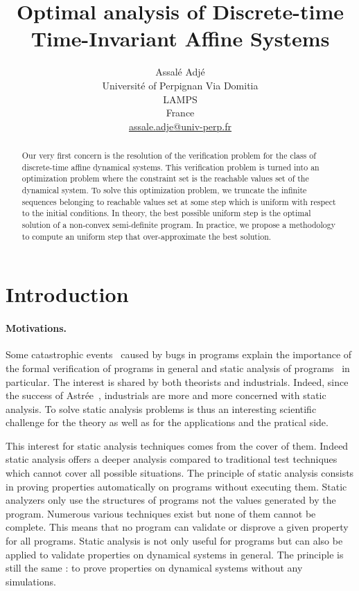 \documentclass[10pt]{article}
\title{Optimal analysis of Discrete-time Time-Invariant Affine Systems}
\author{Assalé Adjé\\
Université of Perpignan Via Domitia\\
LAMPS\\
France\\
\url{assale.adje@univ-perp.fr}
}
\date{}%
\begin{document}
\maketitle
\begin{abstract}
 Our very first concern is the resolution of the verification problem for the class of discrete-time affine dynamical systems. This verification problem is turned into an optimization problem where the constraint set is the reachable values set of the dynamical system. To solve this optimization problem, we truncate the infinite sequences belonging to reachable values set at some step which is uniform with respect to the initial conditions. In theory, the best possible uniform step is the optimal solution of a non-convex semi-definite program. In practice,  we propose a methodology to compute an uniform step that over-approximate the best solution.
\end{abstract}

\section{Introduction}
\paragraph{Motivations.}
Some catastrophic events~\cite{johnson2005natural,mcquaid2012software} caused by bugs in programs explain the importance of the formal verification of programs in general and static analysis of programs~\cite{cousot2010gentle} in particular. The interest is shared by both theorists and industrials. Indeed, since the success of Astrée~\cite{delmas2007astree,souyris2007experimental,bouissou2009space}, industrials are  more and more concerned with static analysis.  To solve static analysis problems is thus an interesting scientific challenge for the theory as well as for the applications and the pratical  side.   

This interest for static analysis techniques comes from the cover of them. Indeed static analysis offers a deeper analysis compared to traditional test techniques which cannot cover all possible situations. The principle of static analysis consists in proving properties automatically on programs without executing them. Static analyzers only use the structures of programs not the values generated by the program.  Numerous various techniques exist but none of them cannot be complete. This means that no program can validate or disprove a given property for all programs. Static analysis is not only useful for programs but can also be applied to validate properties on dynamical systems in general. The principle is still the same : to prove properties on dynamical systems without any simulations.
\end{document}

